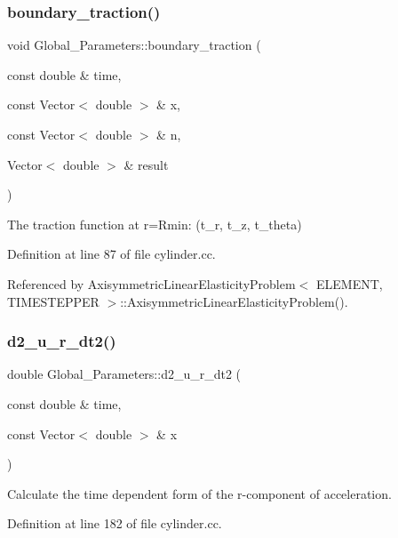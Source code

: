 \subsubsection{\texorpdfstring{boundary\+\_\+traction()}{boundary\_traction()}}
{\footnotesize\ttfamily void Global\+\_\+\+Parameters\+::boundary\+\_\+traction (\begin{DoxyParamCaption}\item[{const double \&}]{time,  }\item[{const Vector$<$ double $>$ \&}]{x,  }\item[{const Vector$<$ double $>$ \&}]{n,  }\item[{Vector$<$ double $>$ \&}]{result }\end{DoxyParamCaption})}



The traction function at r=Rmin\+: (t\+\_\+r, t\+\_\+z, t\+\_\+theta) 



Definition at line 87 of file cylinder.\+cc.



Referenced by Axisymmetric\+Linear\+Elasticity\+Problem$<$ E\+L\+E\+M\+E\+N\+T, T\+I\+M\+E\+S\+T\+E\+P\+P\+E\+R $>$\+::\+Axisymmetric\+Linear\+Elasticity\+Problem().

\mbox{\label{namespaceGlobal__Parameters_a37715fdf266bd7d91b44ad779e20a11a}} 
\subsubsection{\texorpdfstring{d2\+\_\+u\+\_\+r\+\_\+dt2()}{d2\_u\_r\_dt2()}}
{\footnotesize\ttfamily double Global\+\_\+\+Parameters\+::d2\+\_\+u\+\_\+r\+\_\+dt2 (\begin{DoxyParamCaption}\item[{const double \&}]{time,  }\item[{const Vector$<$ double $>$ \&}]{x }\end{DoxyParamCaption})}



Calculate the time dependent form of the r-\/component of acceleration. 



Definition at line 182 of file cylinder.\+cc.



